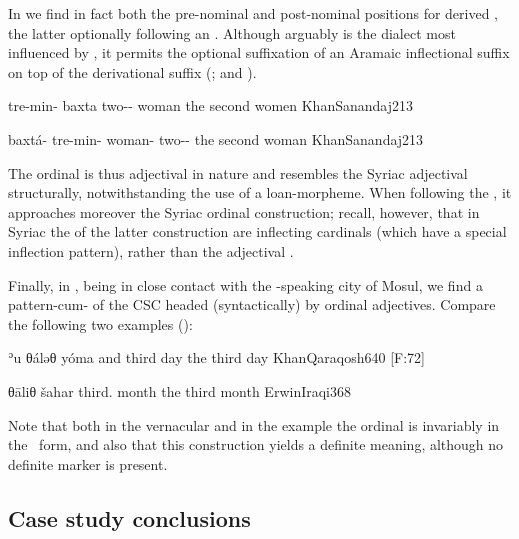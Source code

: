 In \JSan we find in fact both the pre-nominal and post-nominal positions for derived , the latter optionally following an \ez*. Although arguably \JSan is the  dialect most influenced by  , it permits the optional suffixation of an Aramaic inflectional suffix on top of the  derivational suffix (;  and ). 

{tre-min- baxta}
{two-\ord-\opt{\fem} woman}
{the second women}
{KhanSanandaj}{213}

{baxtá- tre-min-}
{woman-\opt{\ez} two-\ord-\opt{\fem}}
{the second woman}
{KhanSanandaj}{213}


The \JSan ordinal is thus adjectival in nature and resembles the Syriac adjectival  structurally, notwithstanding the use of a loan-morpheme. When following the \ez*, it approaches moreover the Syriac ordinal \lnk* construction; recall, however, that in Syriac the \secns of the latter construction are inflecting cardinals (which have a special inflection pattern), rather than the adjectival . 

Finally, in  \Qar, being in close contact with the -speaking city of Mosul, we find a pattern-cum- of the  CSC headed (syntactically) by ordinal adjectives. Compare the following two examples ():

 
 {ʾu\cb{} θáləθ yóma}
 {and\cb{} third day}
 {the third day}
 {KhanQaraqosh}{640 {[F:72]}}
 

 {θāliθ šahar}
 {third.\masc{} month}
 {the third month}
 {ErwinIraqi}{368}
 
\newpage 
Note  that both in the  vernacular and in the \Qar example the ordinal is invariably in the \masc\ form, and also that  this construction yields a definite meaning, although no definite marker is present.





\subsection{Case study conclusions} \label{ss:case_study_conclusions}

